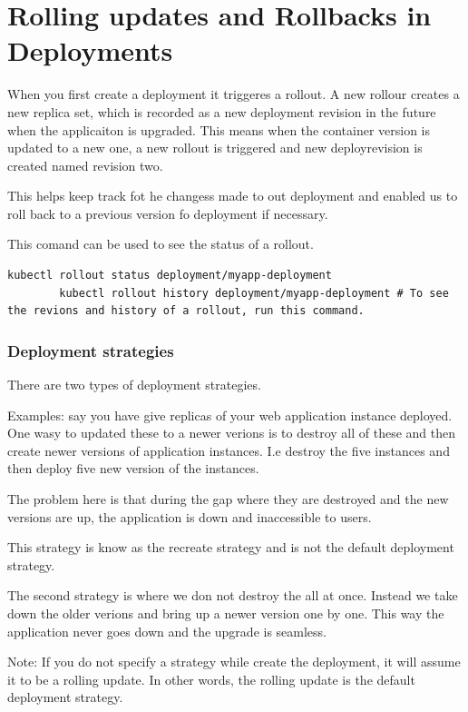 \documentclass[11pt]{book}
\begin{document}
    \section{Rolling updates and Rollbacks in Deployments}
    When you first create a deployment it triggeres a rollout.
    A new rollour creates a new replica set, which is recorded as a new deployment revision in the future when the applicaiton is upgraded.
    This means when the container version is updated to a new one, a new rollout is triggered and new deployrevision is created named revision two.

    This helps keep track fot he changess made to out deployment and enabled us to roll back to a previous version fo deployment if necessary.

    This comand can be used to see the status of a rollout.
    \begin{lstlisting}[language=terminal, caption={Commands}]
        kubectl rollout status deployment/myapp-deployment
        kubectl rollout history deployment/myapp-deployment # To see the revions and history of a rollout, run this command.
    \end{lstlisting}

    \subsubsection{Deployment strategies}
    There are two types of deployment strategies.

    Examples: say you have give replicas of your web application instance deployed.
    One wasy to updated these to a newer verions is to destroy all of these and then create newer versions of application instances.
    I.e destroy the five instances and then deploy five new version of the instances.

    The problem here is that during the gap where they are destroyed and the new versions are up, the application is down and inaccessible to users.

    This strategy is know as the recreate strategy and is not the default deployment strategy.

    The second strategy is where we don not destroy the all at once.
    Instead we take down the older verions and bring up a newer version one by one.
    This way the application never goes down and the upgrade is seamless.

    Note: If you do not specify a strategy while create the deployment, it will assume it to be a rolling update.
    In other words, the rolling update is the default deployment strategy.
\end{document}
